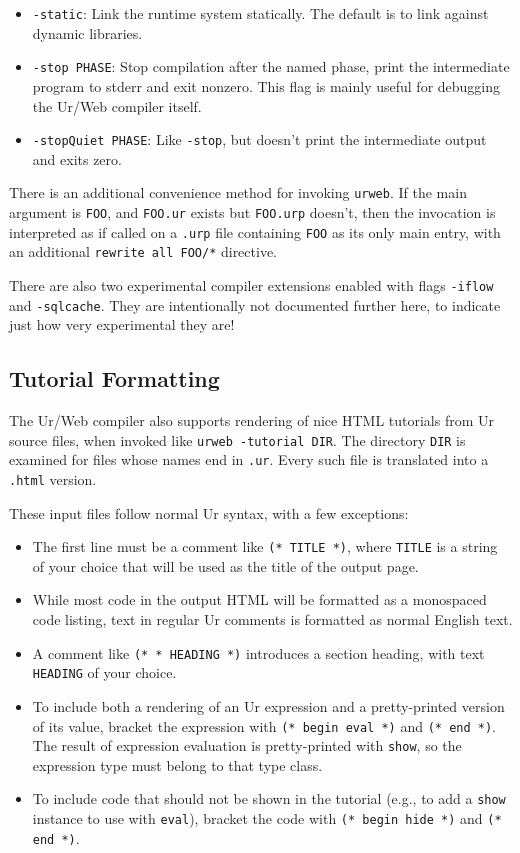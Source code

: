 \documentclass{article}
\newcommand{\cd}[1]{\texttt{#1}}
\begin{document}
\begin{itemize}
\item \texttt{-static}: Link the runtime system statically.  The default is to link against dynamic libraries.

\item \texttt{-stop PHASE}: Stop compilation after the named phase, print the intermediate program to stderr and exit nonzero.  This flag is mainly useful for debugging the Ur/Web compiler itself.

\item \texttt{-stopQuiet PHASE}: Like \texttt{-stop}, but doesn't print the intermediate output and exits zero.
\end{itemize}

There is an additional convenience method for invoking \texttt{urweb}.  If the main argument is \texttt{FOO}, and \texttt{FOO.ur} exists but \texttt{FOO.urp} doesn't, then the invocation is interpreted as if called on a \texttt{.urp} file containing \texttt{FOO} as its only main entry, with an additional \texttt{rewrite all FOO/*} directive.

There are also two experimental compiler extensions enabled with flags \texttt{-iflow} and \texttt{-sqlcache}.  They are intentionally not documented further here, to indicate just how very experimental they are!

\subsection{Tutorial Formatting}

The Ur/Web compiler also supports rendering of nice HTML tutorials from Ur source files, when invoked like \cd{urweb -tutorial DIR}.  The directory \cd{DIR} is examined for files whose names end in \cd{.ur}.  Every such file is translated into a \cd{.html} version.

These input files follow normal Ur syntax, with a few exceptions:
\begin{itemize}
\item The first line must be a comment like \cd{(* TITLE *)}, where \cd{TITLE} is a string of your choice that will be used as the title of the output page.
\item While most code in the output HTML will be formatted as a monospaced code listing, text in regular Ur comments is formatted as normal English text.
\item A comment like \cd{(* * HEADING *)} introduces a section heading, with text \cd{HEADING} of your choice.
\item To include both a rendering of an Ur expression and a pretty-printed version of its value, bracket the expression with \cd{(* begin eval *)} and \cd{(* end *)}.  The result of expression evaluation is pretty-printed with \cd{show}, so the expression type must belong to that type class.
\item To include code that should not be shown in the tutorial (e.g., to add a \cd{show} instance to use with \cd{eval}), bracket the code with \cd{(* begin hide *)} and \cd{(* end *)}.
\end{itemize}
\end{document}
